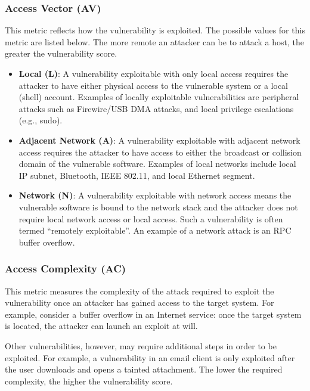     \subsubsection{Access Vector (AV)}\label{subsec:access-vector-av}

    This metric reflects how the vulnerability is exploited. The possible
    values for this metric are listed below. The more remote an
    attacker can be to attack a host, the greater the vulnerability score.

    \begin{itemize}
      \tightlist
      \item
        \textbf{Local (L)}: A vulnerability exploitable with only local access
        requires the attacker to have either physical access to the vulnerable
        system or a local (shell) account. Examples of locally exploitable
        vulnerabilities are peripheral attacks such as Firewire/USB DMA
        attacks, and local privilege escalations (e.g., sudo).
      \item
        \textbf{Adjacent Network (A)}: A vulnerability exploitable with
        adjacent network access requires the attacker to have access to either
        the broadcast or collision domain of the vulnerable software. Examples
        of local networks include local IP subnet, Bluetooth, IEEE 802.11, and
        local Ethernet segment.
      \item
        \textbf{Network (N)}: A vulnerability exploitable with network access
        means the vulnerable software is bound to the network stack and the
        attacker does not require local network access or local access. Such a
        vulnerability is often termed ``remotely exploitable''. An example of
        a network attack is an RPC buffer overflow.
    \end{itemize}

    \subsubsection{Access Complexity (AC)}\label{subsec:access-complexity-ac}

    This metric measures the complexity of the attack required to exploit
    the vulnerability once an attacker has gained access to the target
    system. For example, consider a buffer overflow in an Internet service:
    once the target system is located, the attacker can launch an exploit at
    will.

    Other vulnerabilities, however, may require additional steps in order to
    be exploited. For example, a vulnerability in an email client is only
    exploited after the user downloads and opens a tainted attachment. The
    lower the required complexity, the higher the vulnerability score.

